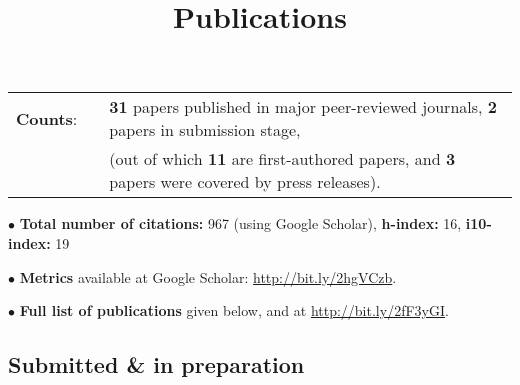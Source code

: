 \documentclass[11pt,letterpaper,sans]{moderncv}
\title{Publications}
\begin{document}
\makecvtitle 



\cvitem{}
{
\begin{tabular}{rcl}
\textbf{Counts}: &\hspace{0.3cm} &{\textbf{31} papers published in major peer-reviewed journals}, {\textbf{2} papers in submission stage,} \\
& &{(out of which \textbf{11} are first-authored papers, and \textbf{3} papers were covered by press releases).}
\end{tabular}
} \vspace{0.3cm}

$\bullet$ \textbf{Total number of citations:} 967 (using Google Scholar), \textbf{h-index:} 16, \textbf{i10-index:} 19 \vspace{0.2cm}

$\bullet$ \textbf{Metrics} available at Google Scholar: {\color{color1} \href{http://bit.ly/2hgVCzb}{http://bit.ly/2hgVCzb}}. \vspace{0.2cm}

$\bullet$ \textbf{Full list of publications} given below, and at {\color{color1} \href{http://bit.ly/2fF3yGI}{http://bit.ly/2fF3yGI}}.

\vspace{0.4cm}
\subsection{Submitted \& in preparation} \vspace{-0.3cm}
\end{document}
